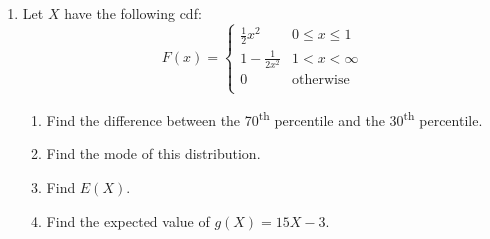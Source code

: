 \documentclass{article}
\begin{document}
\begin{enumerate}
    \item Let $X$ have the following cdf:
    \[
    F(x) =
        \left\{
        \begin{array}{ll}
             \frac{1}{2} x^2 & 0 \le x \le 1\\
             1 - \frac{1}{2x^2} & 1 < x < \infty\\
             0 & \text{otherwise}\\
        \end{array}
        \right.
    \]
    \begin{enumerate}
        \item Find the difference between the 70\textsuperscript{th} percentile and the 30\textsuperscript{th} percentile.\vspace{170pt}
        \item Find the mode of this distribution.\vspace{80pt}
        \item Find $E(X)$.\vspace{160pt}
        \item Find the expected value of $g(X) = 15X - 3$.\vspace{60pt}
    \end{enumerate}
    
\end{enumerate}
\end{document}
